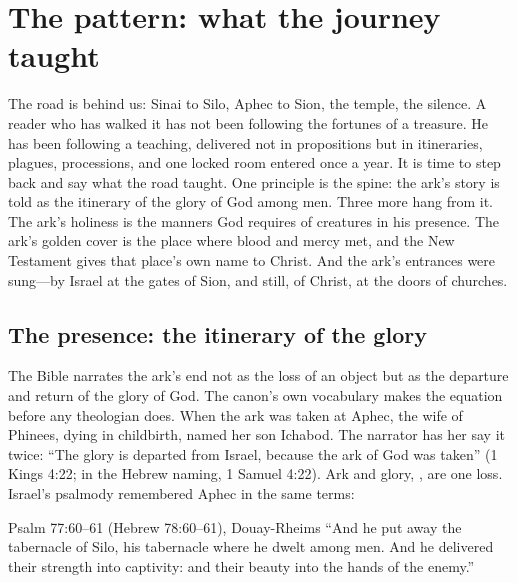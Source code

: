 \sectionguard
\section{The pattern: what the journey taught}

The road is behind us: Sinai to Silo, Aphec to Sion, the temple, the
silence. A reader who has walked it has not been following the fortunes
of a treasure. He has been following a teaching, delivered not in
propositions but in itineraries, plagues, processions, and one locked
room entered once a year. It is time to step back and say what the road
taught. One principle is the spine: the ark's
story is told as the itinerary of the glory of God among men. Three
more hang from it. The ark's holiness is the manners God requires of
creatures in his presence. The ark's golden cover is the place where
blood and mercy met, and the New Testament gives that place's own name
to Christ. And the ark's entrances were sung---by Israel at the gates
of Sion, and still, of Christ, at the doors of churches.

\subsection{The presence: the itinerary of the glory}

The Bible narrates the ark's end not as the loss of an object but as
the departure and return of the glory of God. The canon's own
vocabulary makes the equation before any theologian does. When the ark
was taken at Aphec, the wife of Phinees, dying in childbirth, named her
son Ichabod. The narrator has her say it twice: ``The glory is departed
from Israel, because the ark of God was taken'' (1 Kings 4:22; in the
Hebrew naming, 1 Samuel 4:22). Ark and glory,
, are one loss. Israel's psalmody remembered Aphec in the
same terms:

\begin{witnessbox}{Psalm 77:60--61 (Hebrew 78:60--61), Douay-Rheims}
``And he put away the tabernacle of Silo, his tabernacle where he dwelt
among men. And he delivered their strength into captivity: and their
beauty into the hands of the enemy.''
\end{witnessbox}


